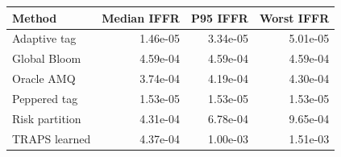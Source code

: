 \begin{tabular}{lrrr}
\toprule
Method & Median IFFR & P95 IFFR & Worst IFFR \\
\midrule
Adaptive tag & 1.46e-05 & 3.34e-05 & 5.01e-05 \\
Global Bloom & 4.59e-04 & 4.59e-04 & 4.59e-04 \\
Oracle AMQ & 3.74e-04 & 4.19e-04 & 4.30e-04 \\
Peppered tag & 1.53e-05 & 1.53e-05 & 1.53e-05 \\
Risk partition & 4.31e-04 & 6.78e-04 & 9.65e-04 \\
TRAPS learned & 4.37e-04 & 1.00e-03 & 1.51e-03 \\
\bottomrule
\end{tabular}
